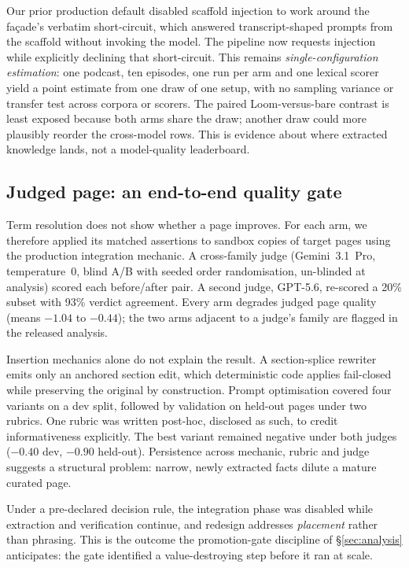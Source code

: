 \documentclass[10pt,twocolumn]{article}
\begin{document}


Our prior production default disabled scaffold injection to work around the fa\c{c}ade's
verbatim short-circuit, which answered transcript-shaped prompts from the scaffold without
invoking the model. The pipeline now requests injection while explicitly declining that
short-circuit. This remains \emph{single-configuration estimation}: one podcast, ten episodes,
one run per arm and one lexical scorer yield a point estimate from one draw of one setup, with
no sampling variance or transfer test across corpora or scorers. The paired Loom-versus-bare
contrast is least exposed because both arms share the draw; another draw could more plausibly
reorder the cross-model rows. This is evidence about where extracted knowledge lands, not a
model-quality leaderboard.

\subsection{Judged page: an end-to-end quality gate}\label{sec:pagejudge}
Term resolution does not show whether a page improves. For each arm, we therefore applied its
matched assertions to sandbox copies of target pages using the production integration mechanic.
A cross-family judge (Gemini~3.1~Pro, temperature~0, blind A/B with seeded order randomisation,
un-blinded at analysis) scored each before/after pair. A second judge, GPT-5.6, re-scored a
20\% subset with 93\% verdict agreement. Every arm degrades judged page quality (means $-1.04$
to $-0.44$); the two arms adjacent to a judge's family are flagged in the released analysis.

Insertion mechanics alone do not explain the result. A section-splice rewriter emits only
an anchored section edit, which deterministic code applies fail-closed while preserving the
original by construction. Prompt optimisation covered four variants on a dev split, followed
by validation on held-out pages under two rubrics. One rubric was written post-hoc, disclosed
as such, to credit informativeness explicitly. The best variant remained negative under both
judges ($-0.40$ dev, $-0.90$ held-out). Persistence across mechanic, rubric and judge suggests
a structural problem: narrow, newly extracted facts dilute a mature curated page.

Under a pre-declared decision rule, the integration phase was disabled while extraction and
verification continue, and redesign addresses \emph{placement} rather than phrasing. This is the
outcome the promotion-gate discipline of \S\ref{sec:analysis} anticipates: the gate identified a
value-destroying step before it ran at scale.
\end{document}
